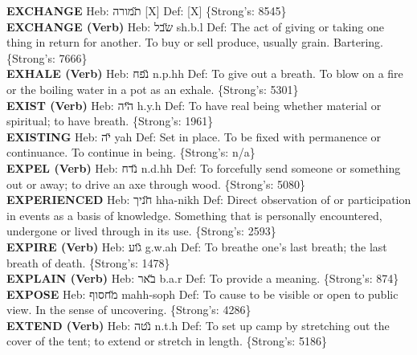 {\textbf{EXCHANGE} Heb: {\large\H תמורה} {[}X{]} Def: {[}X{]} \{Strong's: 8545\}\hfill{}\\

\textbf{EXCHANGE (Verb)} Heb: {\large\H שבל} sh.b.l Def: The act of giving or taking one thing in return for another. To buy or sell produce, usually grain. Bartering. \{Strong's: 7666\}\hfill{}\\

\textbf{EXHALE (Verb)} Heb: {\large\H נפח} n.p.hh Def: To give out a breath. To blow on a fire or the boiling water in a pot as an exhale. \{Strong's: 5301\}\hfill{}\\

\textbf{EXIST (Verb)} Heb: {\large\H היה} h.y.h Def: To have real being whether material or spiritual; to have breath. \{Strong's: 1961\}\hfill{}\\

\textbf{EXISTING} Heb: {\large\H יה} yah Def: Set in place. To be fixed with permanence or continuance. To continue in being. \{Strong's: n/a\}\hfill{}\\

\textbf{EXPEL (Verb)} Heb: {\large\H נדח} n.d.hh Def: To forcefully send someone or something out or away; to drive an axe through wood. \{Strong's: 5080\}\hfill{}\\

\textbf{EXPERIENCED} Heb: {\large\H חניך} hha-nikh Def: Direct observation of or participation in events as a basis of knowledge. Something that is personally encountered, undergone or lived through in its use. \{Strong's: 2593\}\hfill{}\\

\textbf{EXPIRE (Verb)} Heb: {\large\H גוע} g.w.ah Def: To breathe one’s last breath; the last breath of death. \{Strong's: 1478\}\hfill{}\\

\textbf{EXPLAIN (Verb)} Heb: {\large\H באר} b.a.r Def: To provide a meaning. \{Strong's: 874\}\hfill{}\\

\textbf{EXPOSE} Heb: {\large\H מחסוף} mahh-soph Def: To cause to be visible or open to public view. In the sense of uncovering. \{Strong's: 4286\}\hfill{}\\

\textbf{EXTEND (Verb)} Heb: {\large\H נטה} n.t.h Def: To set up camp by stretching out the cover of the tent; to extend or stretch in length. \{Strong's: 5186\}\hfill{}\\

}
